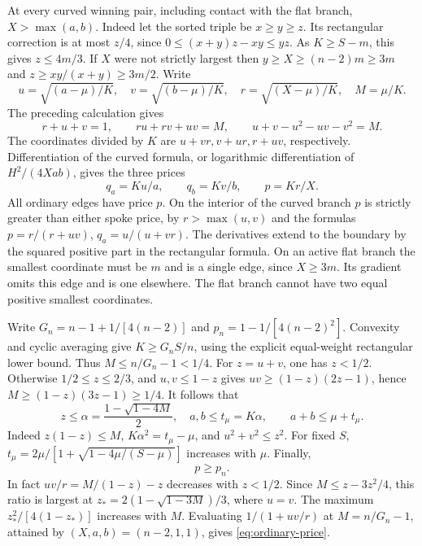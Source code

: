 \documentclass[11pt,a4paper]{article}
\theoremstyle{definition}
\begin{document}
At every curved winning pair, including contact with the flat branch,
$X>\max(a,b)$. Indeed let the sorted triple be $x\ge y\ge z$. Its
rectangular correction is at most $z/4$, since $0\le(x+y)z-xy\le yz$.
As $K\ge S-m$, this gives $z\le 4m/3$. If $X$ were not strictly largest
then $y\ge X\ge(n-2)m\ge3m$ and $z\ge xy/(x+y)\ge3m/2$.
Write
\begin{equation}\label{eq:arms}
 u=\sqrt{(a-\mu)/K},\quad v=\sqrt{(b-\mu)/K},\quad
 r=\sqrt{(X-\mu)/K},\quad M=\mu/K .
\end{equation}
The preceding calculation gives
\begin{equation}\label{eq:contact-conic}
 r+u+v=1,\qquad ru+rv+uv=M,\qquad
 u+v-u^2-uv-v^2=M .
\end{equation}
The coordinates divided by $K$ are $u+vr,v+ur,r+uv$, respectively.
Differentiation of the curved formula, or logarithmic differentiation of
$H^2/(4Xab)$, gives the three prices
\begin{equation}\label{eq:contact-prices}
 q_a=Ku/a,\qquad q_b=Kv/b,\qquad p=Kr/X .
\end{equation}
All ordinary edges have price $p$. On the interior of the curved branch
$p$ is strictly greater than either spoke price, by $r>\max(u,v)$ and
the formulas $p=r/(r+uv)$, $q_a=u/(u+vr)$. The derivatives extend to
the boundary by the squared positive part in the rectangular formula.
On an active flat branch the smallest coordinate must be $m$ and is a
single edge, since $X\ge3m$. Its gradient omits this edge and is one
elsewhere. The flat branch cannot have two equal positive smallest coordinates.

Write $G_n=n-1+1/[4(n-2)]$ and $p_n=1-1/[4(n-2)^2]$.
Convexity and cyclic averaging give $K\ge G_n S/n$, using the explicit
equal-weight rectangular lower bound. Thus $M\le n/G_n-1<1/4$.
For $z=u+v$, one has $z<1/2$. Otherwise $1/2\le z\le2/3$, and
$u,v\le1-z$ gives $uv\ge(1-z)(2z-1)$, hence
$M\ge(1-z)(3z-1)\ge1/4$. It follows that
\begin{equation}\label{eq:contact-caps}
 z\le\alpha=\frac{1-\sqrt{1-4M}}2,\quad
 a,b\le t_\mu=K\alpha,\qquad a+b\le\mu+t_\mu .
\end{equation}
Indeed $z(1-z)\le M$, $K\alpha^2=t_\mu-\mu$, and $u^2+v^2\le z^2$.
For fixed $S$, $t_\mu=2\mu/[1+\sqrt{1-4\mu/(S-\mu)}]$ increases with
$\mu$. Finally,
\begin{equation}\label{eq:ordinary-price}
 p\ge p_n .
\end{equation}
In fact $uv/r=M/(1-z)-z$ decreases with $z<1/2$. Since
$M\le z-3z^2/4$, this ratio is largest at
$z_*=2(1-\sqrt{1-3M})/3$, where $u=v$. The maximum
$z_*^2/[4(1-z_*)]$ increases with $M$. Evaluating $1/(1+uv/r)$ at
$M=n/G_n-1$, attained by $(X,a,b)=(n-2,1,1)$, gives \eqref{eq:ordinary-price}.
\end{document}
